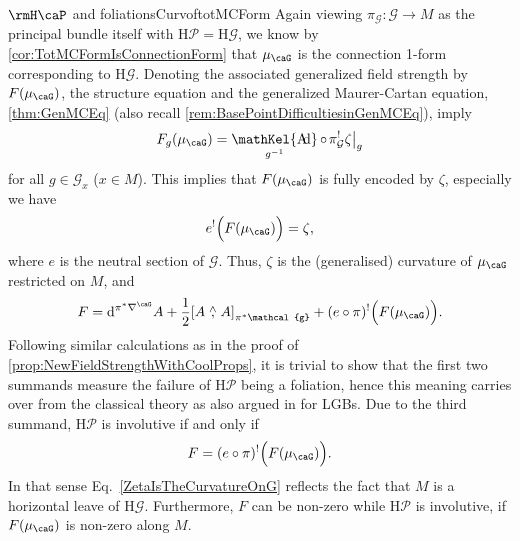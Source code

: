 \documentclass[reqno,a4paper,oneside]{amsart}
\newcommand\mutot{\mu_\caG}
\theoremstyle{plain}
\theoremstyle{remark}
\theoremstyle{definition}
\DeclareMathOperator{\sAd}{\mathKel{A\mkern-5.5mu d}}
\begin{document}
\begin{remarks}{$\rmH \caP$ and foliations}{CurvoftotMCForm}
Again viewing $\pi_{\mathcal{G}} \colon \mathcal{G} \to M$ as the principal bundle itself with $\mathrm{H}\mathcal{P} = \mathrm{H}\mathcal{G}$, we know by \ref{cor:TotMCFormIsConnectionForm} that $\mutot$ is the connection 1-form corresponding to $\mathrm{H}\mathcal{G}$. Denoting the associated generalized field strength by $F\mleft( \mutot \mright)$, the structure equation and the generalized Maurer-Cartan equation, \ref{thm:GenMCEq} (also recall \ref{rem:BasePointDifficultiesinGenMCEq}), imply
\begin{equation*}
F_g\mleft( \mutot \mright)
=
\sAd_{g^{-1}} \circ \mleft. \pi_{\mathcal{G}}^!\zeta \mright|_g
\end{equation*}
for all $g \in \mathcal{G}_x$ ($x \in M$). This implies that $F\mleft( \mutot \mright)$ is fully encoded by $\zeta$, especially we have
\begin{equation}\label{ZetaIsTheCurvatureOnG}
e^!\Bigl(F\mleft( \mutot \mright)\Bigr)
=
\zeta,
\end{equation}
where $e$ is the neutral section of $\mathcal{G}$. Thus, $\zeta$ is the (generalised) curvature of $\mutot$ restricted on $M$, and 
\begin{equation*}
F
=
\mathrm{d}^{\pi^*\nabla^\caG} A
	+ \frac{1}{2} \mleft[ A \stackrel{\wedge}{,} A \mright]_{\pi^*\mathcal{g}}
	+ (e \circ \pi)^!\Bigl(F\mleft( \mutot \mright)\Bigr).
\end{equation*}
Following similar calculations as in the proof of \ref{prop:NewFieldStrengthWithCoolProps}, it is trivial to show that the first two summands measure the failure of $\mathrm{H}\mathcal{P}$ being a foliation, hence this meaning carries over from the classical theory as also argued in \cite[\S 2.5, Cor.\ 2.23]{FernandesMarcutMultiplicativeForms} for LGBs. Due to the third summand, $\mathrm{H}\mathcal{P}$ is involutive if and only if
\begin{equation*}
F
=
(e \circ \pi)^!\Bigl(F\mleft( \mutot \mright)\Bigr).
\end{equation*}
In that sense Eq.\ \eqref{ZetaIsTheCurvatureOnG} reflects the fact that $M$ is a horizontal leave of $\mathrm{H}\mathcal{G}$. Furthermore, $F$ can be non-zero while $\mathrm{H}\mathcal{P}$ is involutive, if $F\mleft( \mutot \mright)$ is non-zero along $M$.
\end{remarks}
\end{document}
